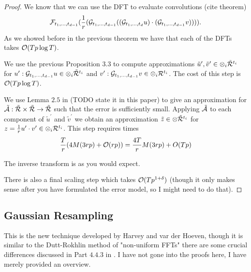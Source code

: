 \begin{proof}
    We know that we can use the DFT to evaluate convolutions (cite theorem)
    \[
        \mathcal F_{t_1,\ldots, t_{d-1}}(\frac{1}{r}(\mathcal G_{t_1, \ldots, t_{d-1}}((\mathcal G_{t_1, \ldots, t_d}u)\cdot (\mathcal G_{t_1, \ldots, t_{d-1}} v)))).
    \]
    As we showed before in the previous theorem we have that each of the DFTs takes $\mathcal O(Tp\log T)$.

    We use the previous Proposition 3.3 to compute approximations $\tilde{u}^\prime, \tilde{v}^\prime \in \otimes_i \tilde{\mathcal R}^{t_i}$ for $u^\prime: \mathcal G_{t_1, \ldots, t_{d-1}} u \in \otimes_i \tilde{\mathcal R}^{t_i}$ and $v^\prime: \mathcal G_{t_1, \ldots, t_{d-1}} v \in \otimes_i \mathcal R^{t_i}$. The cost of this step is $\mathcal O(Tp \log T)$.

    We use Lemma $2.5$ in \cite{nlogn} (TODO state it in this paper) to give an approximation for $\tilde{\mathcal A}: \tilde{\mathcal R} \times \tilde{\mathcal R} \to \tilde{\mathcal R}$ such that the error is sufficiently small. Applying $\tilde{\mathcal A}$ to each component of $\tilde{u}^\prime$ and $\tilde{v}^\prime$ we obtain an approximation $\tilde{z} \in \otimes \tilde{\mathcal R}^{t_i}$ for $z = \frac{1}{r}u^\prime \cdot v^\prime \in \otimes_i \mathcal R^{t_i}$. This step requires times
    \[
        \frac{T}{r}(4M(3rp) + \mathcal O(rp)) = \frac{4T}{r} M(3rp) + O(Tp)
    \]

    The inverse transform is as you would expect.

    There is also a final scaling step which takes $\mathcal O(Tp^{1 + \delta})$ (though it only makes sense after you have formulated the error model, so I might need to do that).
\end{proof}

\subsection{Gaussian Resampling}

This is the new technique developed by Harvey and var der Hoeven, though it is similar to the Dutt-Rokhlin method of "non-uniform FFTs" there are some crucial differences discussed in Part $4.4.3$ in \cite{nlogn}. I have not gone into the proofs here, I have merely provided an overview.


